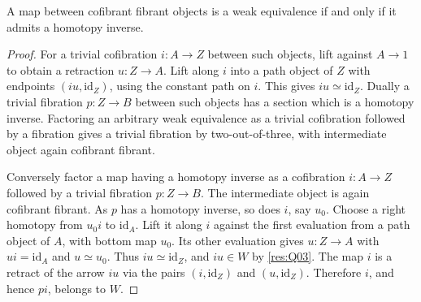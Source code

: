 \begin{proposition}\label{res:Q04}
A map between cofibrant fibrant objects is a weak equivalence
if and only if it admits a homotopy inverse.
\end{proposition}
\begin{proof}
For a trivial cofibration \(i:A\to Z\) between such objects,
lift against \(A\to1\) to obtain a retraction \(u:Z\to A\).
Lift along \(i\) into a path object of \(Z\) with endpoints
\((iu,\mathrm{id}_Z)\), using the constant path on \(i\).
This gives \(iu\simeq\mathrm{id}_Z\). Dually a trivial
fibration \(p:Z\to B\) between such objects has a section
which is a homotopy inverse. Factoring an arbitrary weak
equivalence as a trivial cofibration followed by a fibration
gives a trivial fibration by two-out-of-three, with
intermediate object again cofibrant fibrant.

Conversely factor a map having a homotopy inverse as a
cofibration \(i:A\to Z\) followed by a trivial
fibration \(p:Z\to B\). The intermediate object is again
cofibrant fibrant. As \(p\) has a homotopy inverse, so does
\(i\), say \(u_0\). Choose a right homotopy from
\(u_0 i\) to \(\mathrm{id}_A\). Lift it along \(i\) against
the first evaluation from a path object of \(A\), with
bottom map \(u_0\). Its other evaluation gives
\(u:Z\to A\) with \(ui=\mathrm{id}_A\) and \(u\simeq u_0\).
Thus \(iu\simeq\mathrm{id}_Z\), and \(iu\in W\) by
\ref{res:Q03}. The map \(i\) is a retract of the arrow \(iu\)
via the pairs \((i,\mathrm{id}_Z)\) and
\((u,\mathrm{id}_Z)\). Therefore \(i\), and hence \(pi\),
belongs to \(W\).
\end{proof}

